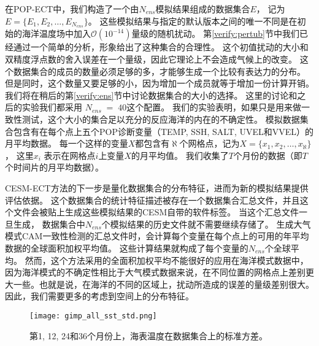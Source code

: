 
在POP-ECT中，我们构造了一个由$N_{ens}$模拟结果组成的数据集合$E$， 记为 $E =\{E_1, E_2, \dots, E_{N_{ens}} \}$。
这些模拟结果与指定的默认版本之间的唯一不同是在初始的海洋温度场中加入$\mathcal{O}(10^{-14})$量级的随机扰动。 
第\ref{verify:pertub}节中我们已经通过一个简单的分析，形象给出了这种集合的合理性。
这个初值扰动的大小和双精度浮点数的舍入误差在一个量级，因此它理论上不会造成气候上的改变。
这个数据集合的成员的数量必须足够的多，才能够生成一个比较有表达力的分布。
但是同时，这个数量又要足够的小，因为增加一个成员就等于增加一份计算开销。 
我们将在稍后的第\ref{verify:ens}节中讨论数据集合的大小的选择。
这里的讨论和之后的实验我们都采用 $N_{ens} \;=\; 40$这个配置。
我们的实验表明，如果只是用来做一致性测试，这个大小的集合足以充分的反应海洋的内在的不确定性。
模拟数据集合包含有在每个点上五个POP诊断变量（TEMP, SSH, SALT, UVEL和VVEL）的月平均数据。
每一个这样的变量$X$都包含有$\aleph$个网格点，记为${X} = \{ x_1, x_2, \dots, x_{\aleph}\}$， 这里$x_i$ 表示在网格点$i$上变量$X$的月平均值。
我们收集了$T$个月份的数据（即$T$个时间片的月平均数据）。

 
CESM-ECT方法的下一步是量化数据集合的分布特征，进而为新的模拟结果提供评估依据。
这个数据集合的统计特征描述被存在一个数据集合汇总文件，并且这个文件会被贴上生成这些模拟结果的CESM自带的软件标签。
当这个汇总文件一旦生成， 数据集合中$N_{ens}$个模拟结果的历史文件就不需要继续存储了。
生成大气模式CAM一致性检测的汇总文件时，会计算每个变量在每个点上的可用的年平均数据的全球面积加权平均值。
这些计算结果就构成了每个变量的$N_{ens}$个全球平均。 
然而，这个方法采用的全面积加权平均不能很好的应用在海洋模式数据中，因为海洋模式的不确定性相比于大气模式数据来说，在不同位置的网格点上差别更大一些。也就是说，在海洋的不同的区域上，扰动所造成的误差的量级差别很大。
因此，我们需要更多的考虑到空间上的分布特征。 

\begin {figure} 
\centering
\texttt{[image: gimp\_all\_sst\_std.png]}
\caption{第1, 12, 24和36个月份上，海表温度在数据集合上的标准方差。}
\label{fig:SST_STD_all}
\end {figure}

